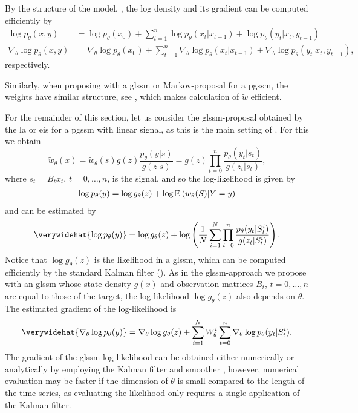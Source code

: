 

By the structure of the model, , the log density and its gradient can be computed efficiently by
\begin{align*}
    \log p_{\theta}(x,y) &= \log p_{\theta}(x_{0}) + \sum_{t = 1}^{n} \log p_{\theta}(x_{t}|x_{t-1}) + \log p_{\theta} (y_{t}|x_{t},y_{t - 1})\\
    \nabla_{\theta}\log p_{\theta}(x,y) &= \nabla_{\theta}\log p_{\theta}(x_{0}) + \sum_{t = 1}^{n} \nabla_{\theta}\log p_{\theta}(x_{t}|x_{t-1}) + \nabla_{\theta}\log p_{\theta} (y_{t}|x_{t},y_{t - 1}),
\end{align*}
respectively. 

Similarly, when proposing with a \acrshort{glssm} or Markov-proposal for a \acrshort{pgssm}, the weights have similar structure, see , which makes calculation of $\tilde w$ efficient. 

For the remainder of this section, let us consider the \acrshort{glssm}-proposal obtained by the \acrshort{la} or \acrshort{eis} for a \acrshort{pgssm} with linear signal, as this is the main setting of . For this we obtain 
$$
    \tilde w_{\theta}(x) = \tilde w_{\theta}(s) g(z)\frac{p_{\theta}(y|s)}{g(z|s)} = g(z) \prod_{t = 0}^n \frac{p_{\theta}(y_{t}|s_{t})}{g(z_{t}|s_{t})},
$$
where $s_{t} = B_{t}x_{t}$, $t = 0, \dots, n$, is the signal, and so the log-likelihood is given by 
\begin{align}
    \label{eq:loglik-pgssm-exact}
    \log p_{\theta}(y) = \log g_{\theta}(z) + \log \mathbb E \left(w_{\theta}(S)|Y = y\right)
\end{align}
and can be estimated by
\begin{align}
    \label{eq:loglik-hat-linearsignal}
    \verywidehat{\log p_{\theta}(y)} = \log g_{\theta}(z) + \log \left(\frac{1}{N}\sum_{i=1}^{N}\prod_{t = 0}^{n} \frac{p_{\theta}(y_{t}|S^{i}_{t})}{ g(z_{t}|S^{i}_{t})}\right).
\end{align}
Notice that $\log g_{\theta}(z)$ is the likelihood in a \acrshort{glssm}, which can be computed efficiently by the standard Kalman filter (). As in the \acrshort{glssm}-approach we propose with an \acrshort{glssm} whose state density $g(x)$ and observation matrices $B_{t}$, $t = 0, \dots, n$ are equal to those of the target, the log-likelihood $\log g_{\theta}(z)$ also depends on $\theta$. The estimated gradient of the log-likelihood is 
$$
    \verywidehat{\nabla_{\theta} \log p_{\theta}(y)} = \nabla_{\theta} \log g_{\theta}(z) + \sum_{i=1}^N W^{i}_\theta \sum_{t = 0}^n \nabla_{\theta} \log p_{\theta}(y_{t}|S_{t}^{i}).
$$
The gradient of the \acrshort{glssm} log-likelihood can be obtained either numerically or analytically by employing the Kalman filter and smoother \citep{Koopman1992Exact}, however, numerical evaluation may be faster if the dimension of $\theta$ is small compared to the length of the time series, as evaluating the likelihood only requires a single application of the Kalman filter. 

